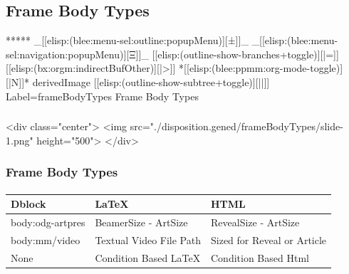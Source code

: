 \begin{whenOrg}
\section{Frame Body Types}

\begin{whenOrg}
*****  _[[elisp:(blee:menu-sel:outline:popupMenu)][±]]_ _[[elisp:(blee:menu-sel:navigation:popupMenu)][Ξ]]_ [[elisp:(outline-show-branches+toggle)][|=]] [[elisp:(bx:orgm:indirectBufOther)][|>]] *[[elisp:(blee:ppmm:org-mode-toggle)][|N]]*  derivedImage [[elisp:(outline-show-subtree+toggle)][||]] Label=frameBodyTypes Frame Body Types
\end{whenOrg}

\begin{htmlonly}

\begin{frame}[fragile,plain,label=frameBodyTypes]
    \frametitle{}
    \framesubtitle{}
    \begin{rawhtml}
<div class="center">
<img src="./disposition.gened/frameBodyTypes/slide-1.png" height="500">
</div>
    \end{rawhtml}
\end{frame}
\end{htmlonly}

\begin{verblatex}

\begin{frame}[fragile,label=frameBodyTypes]
    \frametitle{Frame Body Types}
    \framesubtitle{}

\small
\begin{tabular}{|p{1.2in}|p{1.75in}|p{1.75in}|}
  \hline
  \textbf{Dblock} & \textbf{LaTeX} & \textbf{HTML} \\
  \hline
  body:odg-artpres & BeamerSize - ArtSize & RevealSize - ArtSize \\
  \hline
  body:mm/video & Textual Video File Path & Sized for Reveal or Article \\
  \hline
  None & Condition Based LaTeX & Condition Based Html \\
  \hline
\end{tabular}
\normalsize



\end{frame}
\end{verblatex}
\end{whenOrg}
